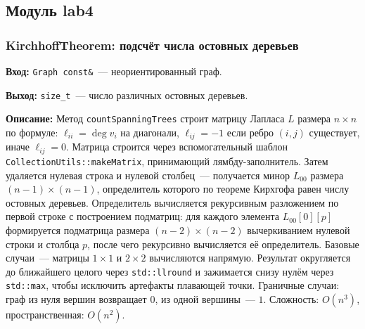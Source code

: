 \subsection{Модуль lab4}

\subsubsection{KirchhoffTheorem: подсчёт числа остовных деревьев}

\textbf{Вход:} \texttt{Graph const\&}~--- неориентированный граф.

\textbf{Выход:} \texttt{size\_t}~--- число различных остовных деревьев.

\textbf{Описание:} Метод \texttt{countSpanningTrees} строит матрицу
Лапласа $L$ размера $n \times n$ по формуле: $\ell_{ii} = \deg v_i$
на диагонали, $\ell_{ij} = -1$ если ребро $(i,j)$ существует,
иначе $\ell_{ij} = 0$. Матрица строится через вспомогательный шаблон
\texttt{CollectionUtils::makeMatrix}, принимающий лямбду-заполнитель.
Затем удаляется нулевая строка и нулевой столбец~--- получается минор
$L_{00}$ размера $(n-1)\times(n-1)$, определитель которого по теореме
Кирхгофа равен числу остовных деревьев. Определитель вычисляется
рекурсивным разложением по первой строке с построением подматриц:
для каждого элемента $L_{00}[0][p]$ формируется подматрица размера
$(n-2)\times(n-2)$ вычеркиванием нулевой строки и столбца $p$,
после чего рекурсивно вычисляется её определитель. Базовые случаи~---
матрицы $1\times1$ и $2\times2$ вычисляются напрямую. Результат
округляется до ближайшего целого через \texttt{std::llround} и
зажимается снизу нулём через \texttt{std::max}, чтобы исключить
артефакты плавающей точки. Граничные случаи: граф из нуля вершин
возвращает $0$, из одной вершины~--- $1$.
Сложность: $O(n^3)$, пространственная: $O(n^2)$.

